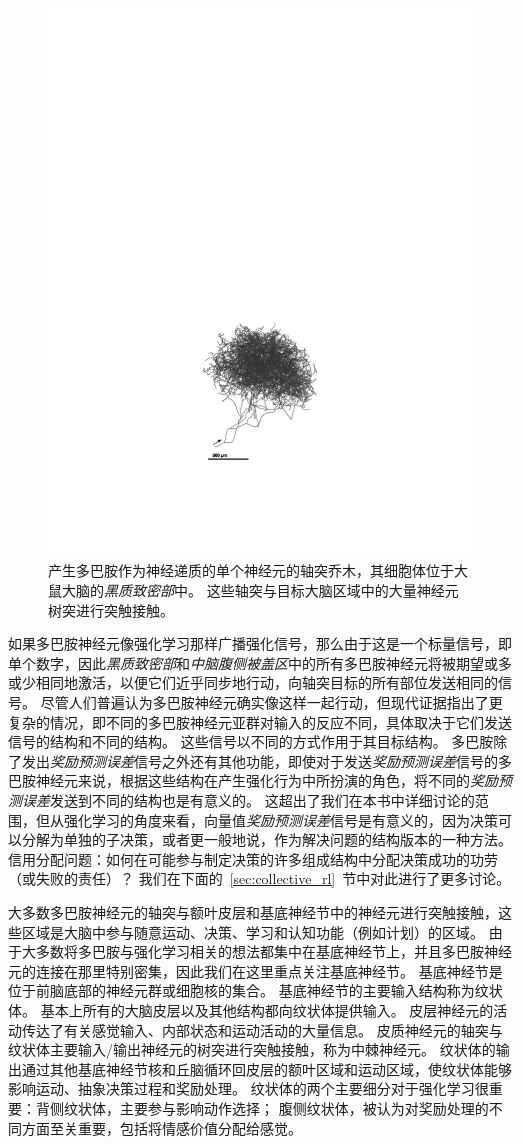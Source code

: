 \begin{figure}[!htb]
	\centering
	\includegraphics[width=0.5\linewidth]{chap12/fig_12_1}
	\caption{产生多巴胺作为神经递质的单个神经元的轴突乔木，其细胞体位于大鼠大脑的\textit{黑质致密部}中。
		这些轴突与目标大脑区域中的大量神经元树突进行突触接触。 \label{fig:12_1}}
\end{figure}


如果多巴胺神经元像强化学习那样广播强化信号，那么由于这是一个标量信号，即单个数字，因此\textit{黑质致密部}和\textit{中脑腹侧被盖区}中的所有多巴胺神经元将被期望或多或少相同地激活，以便它们近乎同步地行动，向轴突目标的所有部位发送相同的信号。 
尽管人们普遍认为多巴胺神经元确实像这样一起行动，但现代证据指出了更复杂的情况，即不同的多巴胺神经元亚群对输入的反应不同，具体取决于它们发送信号的结构和不同的结构。
这些信号以不同的方式作用于其目标结构。
多巴胺除了发出\textit{奖励预测误差}信号之外还有其他功能，即使对于发送\textit{奖励预测误差}信号的多巴胺神经元来说，根据这些结构在产生强化行为中所扮演的角色，将不同的\textit{奖励预测误差}发送到不同的结构也是有意义的。
这超出了我们在本书中详细讨论的范围，但从强化学习的角度来看，向量值\textit{奖励预测误差}信号是有意义的，因为决策可以分解为单独的子决策，或者更一般地说，作为解决问题的结构版本的一种方法。
信用分配问题：如何在可能参与制定决策的许多组成结构中分配决策成功的功劳（或失败的责任）？
我们在下面的~\ref{sec:collective_rl}~节中对此进行了更多讨论。


大多数多巴胺神经元的轴突与额叶皮层和基底神经节中的神经元进行突触接触，这些区域是大脑中参与随意运动、决策、学习和认知功能（例如计划）的区域。
由于大多数将多巴胺与强化学习相关的想法都集中在基底神经节上，并且多巴胺神经元的连接在那里特别密集，因此我们在这里重点关注基底神经节。
基底神经节是位于前脑底部的神经元群或细胞核的集合。 基底神经节的主要输入结构称为纹状体。
基本上所有的大脑皮层以及其他结构都向纹状体提供输入。
皮层神经元的活动传达了有关感觉输入、内部状态和运动活动的大量信息。
皮质神经元的轴突与纹状体主要输入/输出神经元的树突进行突触接触，称为中棘神经元。
纹状体的输出通过其他基底神经节核和丘脑循环回皮层的额叶区域和运动区域，使纹状体能够影响运动、抽象决策过程和奖励处理。
纹状体的两个主要细分对于强化学习很重要：背侧纹状体，主要参与影响动作选择；
腹侧纹状体，被认为对奖励处理的不同方面至关重要，包括将情感价值分配给感觉。



